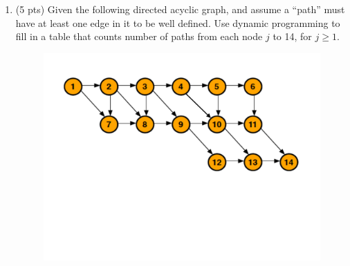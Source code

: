\documentclass[12pt]{article}
\theoremstyle{remark}
\newtheorem*{solution}{Solution}
\begin{document}
\begin{enumerate}
\begin{enumerate}
    \item (2 pts) List out the optimal subset and provide it's weight and value.
    \begin{solution}
$\newline$ The optimal subset is (4,3), (1,2), (5,4), or items 1, 2, 4 (Array[0,1,3])
    \end{solution}

\end{enumerate}
\pagebreak
    
        \item (5 pts) Given the following directed acyclic graph, and assume a ``path'' must have at least one edge in it to be well defined. Use dynamic programming to fill in a table that counts number of paths from each node $j$ to 14, for $j \geq 1$. 

        \begin{figure}[h!]
        \begin{center}
        \includegraphics[scale=0.45]{dag_ps9.pdf} 
        \end{center}
        \end{figure}
    

\end{enumerate}
\end{document}
